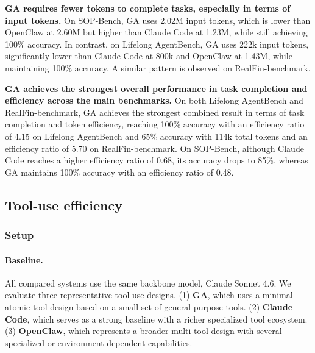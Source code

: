\textbf{GA requires fewer tokens to complete tasks, especially in terms of input tokens.}
On SOP-Bench, GA uses 2.02M input tokens, which is lower than OpenClaw at 2.60M but higher than Claude Code at 1.23M, while still achieving 100\% accuracy. In contrast, on Lifelong AgentBench, GA uses 222k input tokens, significantly lower than Claude Code at 800k and OpenClaw at 1.43M, while maintaining 100\% accuracy. A similar pattern is observed on RealFin-benchmark.

\textbf{GA achieves the strongest overall performance in task completion and efficiency across the main benchmarks.}
On both Lifelong AgentBench and RealFin-benchmark, GA achieves the strongest combined result in terms of task completion and token efficiency, reaching 100\% accuracy with an efficiency ratio of 4.15 on Lifelong AgentBench and 65\% accuracy with 114k total tokens and an efficiency ratio of 5.70 on RealFin-benchmark. On SOP-Bench, although Claude Code reaches a higher efficiency ratio of 0.68, its accuracy drops to 85\%, whereas GA maintains 100\% accuracy with an efficiency ratio of 0.48.

\subsection{Tool-use efficiency}
\label{sec:dimension4_tool_use_efficiency}
\subsubsection{Setup}
\label{sec:exp_tooluse_setup}

\paragraph{Baseline.}
All compared systems use the same backbone model, Claude Sonnet 4.6. We evaluate three representative tool-use designs. (1) \textbf{GA}, which uses a minimal atomic-tool design based on a small set of general-purpose tools. (2) \textbf{Claude Code}, which serves as a strong baseline with a richer specialized tool ecosystem. (3) \textbf{OpenClaw}, which represents a broader multi-tool design with several specialized or environment-dependent capabilities.

